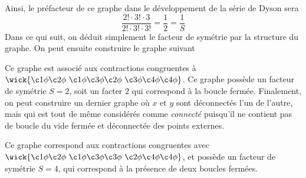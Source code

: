 \documentclass{article}
\numberwithin{equation}{section}
\theoremstyle{solution}
\begin{document}
Ainsi, le préfacteur de ce graphe dans le développement de la série de Dyson sera 
\begin{equation}
        \frac{2! \cdot 3! \cdot 3}{2!\cdot 3! \cdot 3!} = \frac{1}{2} = \frac{1}{S}
\end{equation} 
Dans ce qui suit, on déduit simplement le facteur de symétrie par la structure du graphe.
On peut ensuite construire le graphe suivant
\begin{figure}[H]
\centering
{} 
\end{figure}
\noindent
Ce graphe est associé aux contractions congruentes à $\wick{\c1 \phi \c2 \phi \,\, \c1 \phi \c3 \phi \c2 \phi\,\, \c3 \phi \c4 \phi \c4 \phi}$. Ce graphe possède un facteur de symétrie 
$S = 2 $, soit un facter $2$ qui correspond à la boucle fermée. 
Finalement, on peut construire un dernier graphe où $x$ et $y$ sont déconnectés l'un de l'autre, 
mais qui est tout de même considérés comme \textit{connecté} puisqu'il ne contient pas de boucle du vide fermée et déconnectée des points externes. 
\begin{figure}[H]
\centering
{} 
\end{figure}
\noindent
Ce graphe correspond aux contractions congruentes avec $\wick{\c1 \phi \c2 \phi\,\, \c1 \phi \c3 \phi \c3 \phi\,\, \c2 \phi \c4 \phi \c4 \phi}$, et possède un facteur de symétrie 
$S = 4$, qui correspond à la présence de deux boucles fermées.
\end{document}
